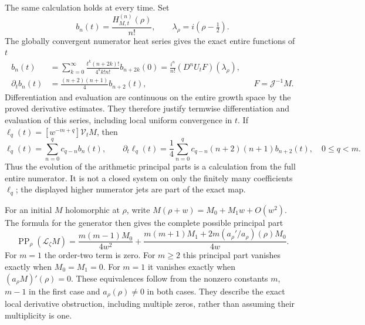 The same calculation holds at every time. Set
\[
 b_n(t)=\frac{H_{M,t}^{(n)}(\rho)}{n!},
 \qquad \lambda_\rho=i(\rho-\tfrac12).
\]
The globally convergent numerator heat series gives the exact
entire functions of $t$
\begin{equation}\label{eq:cq-meromorphic-time-jets}
 \begin{aligned}
 b_n(t)
 &=\sum_{k=0}^{\infty}
       \frac{t^k(n+2k)!}{4^k k!n!}b_{n+2k}(0)
  =\frac{i^n}{n!}(D^nU_tF)(\lambda_\rho),\\
 \partial_tb_n(t)&=\frac{(n+2)(n+1)}4 b_{n+2}(t),
   &&F=\mathscr J^{-1}M.
 \end{aligned}
\end{equation}
Differentiation and evaluation are continuous on the entire
growth space by the proved derivative estimates. They therefore
justify termwise differentiation and evaluation of this series,
including local uniform convergence in $t$. If
$\ell_q(t)=[w^{-m+q}]\mathcal V_tM$, then
\begin{equation}\label{eq:cq-meromorphic-principal-evolution}
 \ell_q(t)=\sum_{n=0}^q c_{q-n}b_n(t),\qquad
 \partial_t\ell_q(t)=\frac14\sum_{n=0}^q
           c_{q-n}(n+2)(n+1)b_{n+2}(t),\quad 0\leq q<m.
\end{equation}
Thus the evolution of the arithmetic principal parts is a
calculation from the full entire numerator. It is not a closed
system on only the finitely many coefficients $\ell_q$; the
displayed higher numerator jets are part of the exact map.

For an initial $M$ holomorphic at $\rho$, write
$M(\rho+w)=M_0+M_1w+O(w^2)$. The formula for the generator
then gives the complete possible principal part
\begin{equation}\label{eq:cq-meromorphic-Schwartz-instantaneous-poles}
 \operatorname{PP}_\rho(\mathcal L_\zeta M)
 =\frac{m(m-1)M_0}{4w^2}
  +\frac{m(m+1)M_1+2m(a_\rho'/a_\rho)(\rho)M_0}{4w}.
\end{equation}
For $m=1$ the order-two term is zero. For $m\geq2$ this
principal part vanishes exactly when $M_0=M_1=0$. For $m=1$
it vanishes exactly when $(a_\rho M)'(\rho)=0$. These
equivalences follow from the nonzero constants $m$, $m-1$
in the first case and $a_\rho(\rho)\ne0$ in both cases.
They describe the exact local derivative obstruction, including
multiple zeros, rather than assuming their multiplicity is one.


